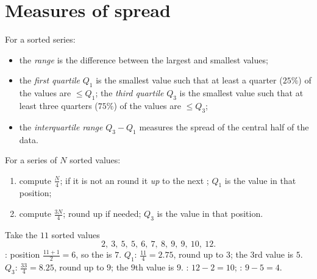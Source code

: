 \section{Measures of spread}

\begin{definition}\label{def:g10:stats:quartiles}
For a sorted series:
\begin{itemize}
  \item the \emph{range} is the difference between the
        largest and smallest values;
  \item the \emph{first quartile} $Q_1$ is the smallest
        value such that at least a quarter ($25\%$) of the values are
        $\leq Q_1$; the \emph{third quartile} $Q_3$ is the smallest value
        such that at least three quarters ($75\%$) of the values are
        $\leq Q_3$;
  \item the \emph{interquartile range} $Q_3 - Q_1$ measures the spread of
        the central half of the data.
\end{itemize}
\end{definition}

\begin{method}\label{met:g10:stats:quartiles}
For a series of $N$ sorted values:
\begin{enumerate}
  \item compute $\frac N4$; if it is not an  round it \emph{up} to
        the next ; $Q_1$ is the value in that position;
  \item compute $\frac{3N}{4}$; round up if needed; $Q_3$ is the value in
        that position.
\end{enumerate}
\end{method}

\begin{example}\label{ex:g10:stats:quartiles}
Take the $11$ sorted values
\[
2,\ 3,\ 5,\ 5,\ 6,\ 7,\ 8,\ 9,\ 9,\ 10,\ 12 .
\]
: position $\frac{11+1}{2} = 6$, so the  is $7$.
$Q_1$: $\frac{11}{4} = 2.75$, round up to $3$; the $3$rd value is $5$.
$Q_3$: $\frac{33}{4} = 8.25$, round up to $9$; the $9$th value is $9$.
: $12 - 2 = 10$; : $9 - 5 = 4$.
\end{example}

